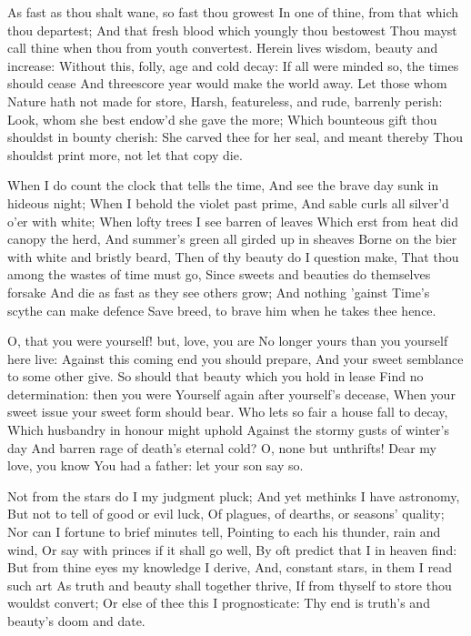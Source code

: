 \documentclass[twocolumn]{book}
\begin{document}
As fast as thou shalt wane, so fast thou growest
In one of thine, from that which thou departest;
And that fresh blood which youngly thou bestowest
Thou mayst call thine when thou from youth convertest.
Herein lives wisdom, beauty and increase:
Without this, folly, age and cold decay:
If all were minded so, the times should cease
And threescore year would make the world away.
Let those whom Nature hath not made for store,
Harsh, featureless, and rude, barrenly perish:
Look, whom she best endow'd she gave the more;
Which bounteous gift thou shouldst in bounty cherish:
  She carved thee for her seal, and meant thereby
  Thou shouldst print more, not let that copy die.


When I do count the clock that tells the time,
And see the brave day sunk in hideous night;
When I behold the violet past prime,
And sable curls all silver'd o'er with white;
When lofty trees I see barren of leaves
Which erst from heat did canopy the herd,
And summer's green all girded up in sheaves
Borne on the bier with white and bristly beard,
Then of thy beauty do I question make,
That thou among the wastes of time must go,
Since sweets and beauties do themselves forsake
And die as fast as they see others grow;
  And nothing 'gainst Time's scythe can make defence
  Save breed, to brave him when he takes thee hence.


O, that you were yourself! but, love, you are
No longer yours than you yourself here live:
Against this coming end you should prepare,
And your sweet semblance to some other give.
So should that beauty which you hold in lease
Find no determination: then you were
Yourself again after yourself's decease,
When your sweet issue your sweet form should bear.
Who lets so fair a house fall to decay,
\numerus*{}Which husbandry in honour might uphold
Against the stormy gusts of winter's day
And barren rage of death's eternal cold?
  O, none but unthrifts! Dear my love, you know
  You had a father: let your son say so.


Not from the stars do I my judgment pluck;
And yet methinks I have astronomy,
But not to tell of good or evil luck,
Of plagues, of dearths, or seasons' quality;
Nor can I fortune to brief minutes tell,
Pointing to each his thunder, rain and wind,
Or say with princes if it shall go well,
By oft predict that I in heaven find:
But from thine eyes my knowledge I derive,
And, constant stars, in them I read such art
As truth and beauty shall together thrive,
If from thyself to store thou wouldst convert;
  Or else of thee this I prognosticate:
  Thy end is truth's and beauty's doom and date.
\end{document}
